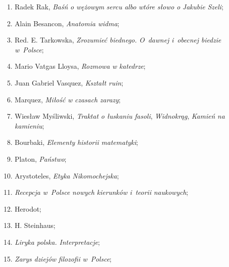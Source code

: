 \documentclass[a4paper,11pt]{article}
\begin{document}
\begin{enumerate}
\item Radek Rak, \textit{Baśń o wężowym sercu albo wtóre słowo o Jakubie
    Szeli};



\item Alain Besancon, \textit{Anatomia widma};



\item Red. E. Tarkowska, \textit{Zrozumieć biednego. O~dawnej i~obecnej
    biedzie w~Polsce};



\item Mario Vatgas Lloysa, \textit{Rozmowa w katedrze};



\item Juan Gabriel Vasquez, \textit{Kształt ruin};



\item Marquez, \textit{Miłość w czasach zarazy};



\item Wiesław Myśliwski, \textit{Traktat o łuskaniu fasoli},
  \textit{Widnokrąg}, \textit{Kamień na kamieniu};



\item Bourbaki, \textit{Elementy historii matematyki};



\item Platon, \textit{Państwo};



\item Arystoteles, \textit{Etyka Nikomochejska};



\item \textit{Recepcja w~Polsce nowych kierunków i~teorii naukowych};



\item Herodot;



\item H. Steinhaus;



\item \textit{Liryka polska. Interpretacje};



\item \textit{Zarys dziejów filozofii w~Polsce};




\end{enumerate}
\end{document}
